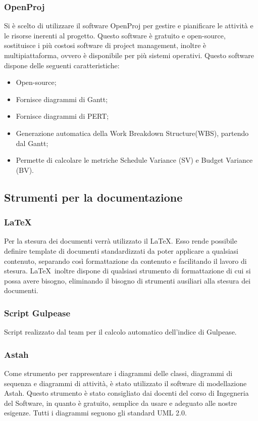 \subsubsection{OpenProj}
Si è scelto di utilizzare il software OpenProj per gestire e pianificare le attività e le risorse inerenti al progetto.
Questo software è gratuito e open-source, sostituisce i più costosi software di project management, inoltre è multipiattaforma, ovvero è disponibile per più sistemi operativi.
Questo software dispone delle seguenti caratteristiche:
\begin{itemize}
\item Open-source;
\item Fornisce diagrammi di Gantt;
\item Fornisce diagrammi di PERT;
\item Generazione automatica della Work Breakdown Structure(WBS), partendo dal Gantt;
\item Permette di calcolare le metriche Schedule Variance (SV) e Budget Variance (BV).
\end{itemize}
\label{}


\subsection{Strumenti per la documentazione}
\label{}
\subsubsection{LaTeX}
\label{5.7}
Per la stesura dei documenti verrà utilizzato il  \LaTeX. Esso rende possibile definire template di documenti standardizzati da poter applicare a qualsiasi contenuto, separando così formattazione da contenuto e facilitando il lavoro di stesura. \LaTeX\ inoltre dispone di qualsiasi strumento di formattazione di cui si possa avere bisogno, eliminando il bisogno di strumenti ausiliari alla stesura dei documenti.

\subsubsection{Script Gulpease}
\label{}
Script realizzato dal team per il calcolo automatico dell'indice di Gulpease.

\subsubsection{Astah}
Come strumento per rappresentare i diagrammi delle classi, diagrammi di sequenza e diagrammi di attività, è stato utilizzato il software di modellazione Astah. Questo strumento è stato consigliato dai docenti del corso di Ingegneria del Software, in quanto è gratuito, semplice da usare e adeguato alle nostre esigenze. Tutti i diagrammi seguono gli standard UML 2.0.


